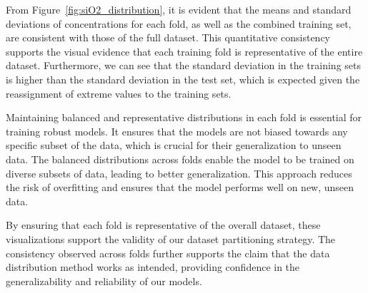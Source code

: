 From Figure~\ref{fig:siO2_distribution}, it is evident that the means and standard deviations of  concentrations for each fold, as well as the combined training set, are consistent with those of the full dataset.
This quantitative consistency supports the visual evidence that each training fold is representative of the entire dataset.
Furthermore, we can see that the standard deviation in the training sets is higher than the standard deviation in the test set, which is expected given the reassignment of extreme values to the training sets.

Maintaining balanced and representative distributions in each fold is essential for training robust models.
It ensures that the models are not biased towards any specific subset of the data, which is crucial for their generalization to unseen data.
The balanced distributions across folds enable the model to be trained on diverse subsets of data, leading to better generalization.
This approach reduces the risk of overfitting and ensures that the model performs well on new, unseen data.

By ensuring that each fold is representative of the overall dataset, these visualizations support the validity of our dataset partitioning strategy.
The consistency observed across folds further supports the claim that the data distribution method works as intended, providing confidence in the generalizability and reliability of our models.